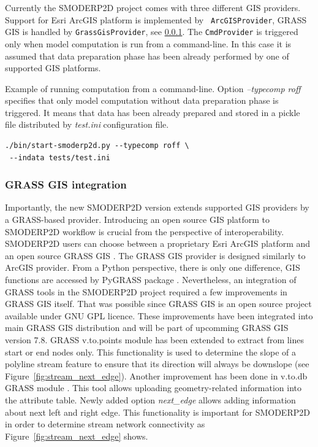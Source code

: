 Currently the SMODERP2D project comes with three different GIS
providers. Support for Esri ArcGIS platform is implemented by {\tt
  ArcGISProvider}, GRASS GIS is handled by {\tt GrassGisProvider}, see
\ref{sec:grass_provider}. The {\tt CmdProvider} is triggered only when
model computation is run from a command-line. In this case it is
assumed that data preparation phase has been already performed by one
of supported GIS platforms.

Example of running computation from a command-line. Option {\it
  --typecomp roff} specifies that only model computation without data
preparation phase is triggered. It means that data has been already
prepared and stored in a pickle file distributed by {\it test.ini}
configuration file.

\begin{verbatim}
./bin/start-smoderp2d.py --typecomp roff \
 --indata tests/test.ini
\end{verbatim}

\subsubsection{GRASS GIS integration}\label{sec:grass_provider}
Importantly, the new SMODERP2D version extends supported GIS providers
by a GRASS-based provider. Introducing an open source GIS platform to
SMODERP2D workflow is crucial from the perspective of
interoperability. SMODERP2D users can choose between a proprietary
Esri ArcGIS platform and an open source GRASS GIS
\cite{neteler2012grass}. The GRASS GIS provider is designed similarly
to ArcGIS provider. From a Python perspective, there is only one
difference, GIS functions are accessed by PyGRASS package
\cite{ijgi2010201}. Nevertheless, an integration of GRASS tools in the
SMODERP2D project required a few improvements in GRASS GIS
itself. That was possible since GRASS GIS is an open source project
available under GNU GPL licence. These improvements have been
integrated into main GRASS GIS distribution and will be part of
upcomming GRASS GIS version 7.8.  GRASS v.to.points module
\cite{v-to-points-2019} has been extended to extract from lines start
or end nodes only. This functionality is used to determine the slope
of a polyline stream feature to ensure that its direction will always
be downslope (see Figure~\ref{fig:stream_next_edge}). Another
improvement has been done in v.to.db GRASS module
\cite{v-to-db-2019}. This tool allows uploading geometry-related
information into the attribute table. Newly added option {\it
  next\_edge} allows adding information about next left and right
edge. This functionality is important for SMODERP2D in order to
determine stream network connectivity as
Figure~\ref{fig:stream_next_edge} shows.


